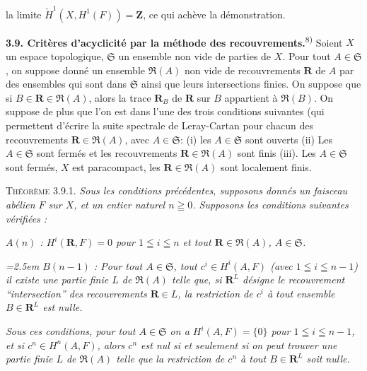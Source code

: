 
\noindent la limite $\check H^1(X,H^1(F))=\mathbf Z$, ce qui achève la
démonstration.

\textbf{3.9. Critères d'acyclicité par la méthode des
recouvrements.}\textsuperscript{8)}
Soient $X$ un espace topologique, $\mathfrak S$ un ensemble non vide de parties
de $X$. Pour tout $A\in\mathfrak S$, on suppose donné un ensemble
$\mathfrak R(A)$ non vide de recouvrements $\mathbf R$ de $A$ par des
ensembles qui sont dans $\mathfrak S$ ainsi que leurs intersections finies. On
suppose que si $B\in\mathbf R\in\mathfrak R(A)$, alors la trace
$\mathbf R_B$ de $\mathbf R$ sur $B$ appartient à $\mathfrak R(B)$.
On suppose de plus que l'on est dans l'une des trois conditions suivantes
(qui permettent d'écrire la suite spectrale de Leray-Cartan pour chacun des
recouvrements $\mathbf R\in\mathfrak R(A)$, avec $A\in\mathfrak S$: (i) les
$A\in\mathfrak S$ sont ouverts (ii) Les $A\in\mathfrak S$ sont fermés et les
recouvrements $\mathbf R\in\mathfrak R(A)$ sont finis (iii). Les
$A\in\mathfrak S$ sont fermés, $X$ est paracompact, les
$\mathbf R\in\mathfrak R(A)$ sont localement finis.

\textsc{Théorème 3.9.1.} \textit{Sous les conditions précédentes,
supposons donnés un faisceau abélien $F$ sur $X$, et un entier naturel
$n\geqq 0$. Supposons les conditions suivantes vérifiées :}

\begingroup\itshape
$A(n)$ : $H^i(\mathbf R,F)=0$ pour $1\leqq i\leqq n$ et tout
$\mathbf R\in\mathfrak R(A)$, $A\in\mathfrak S$.\par
\endgroup

\begingroup\itshape\hangindent=2.5em
$B(n-1)$ : Pour tout $A\in\mathfrak S$, tout $c^i\in H^i(A,F)$ \textup{(}avec
$1\leqq i\leqq n-1$\textup{)} il existe une partie finie $L$ de $\mathfrak R(A)$ telle
que, si $\mathbf R^L$ désigne le recouvrement ``intersection'' des
recouvrements $\mathbf R\in L$, la restriction de $c^i$ à tout ensemble
$B\in\mathbf R^L$ est nulle.\par
\endgroup

\noindent\textit{Sous ces conditions, pour tout $A\in\mathfrak S$ on a
$H^i(A,F)=\{0\}$ pour $1\leqq i\leqq n-1$, et si $c^n\in H^n(A,F)$, alors
$c^n$ est nul si et seulement si on peut trouver une partie finie $L$ de
$\mathfrak R(A)$ telle que la restriction de $c^n$ à tout
$B\in\mathbf R^L$ soit nulle.}

